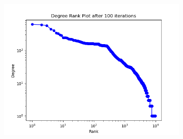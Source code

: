 \documentclass[12pt]{article}
\numberwithin{equation}{section}
\begin{document}
\begin{figure}[!ht]
\begin{subfigure}[b]{0.32\textwidth}
\end{subfigure}
\hfill
\begin{subfigure}[b]{0.32\textwidth}
    \includegraphics[width=\textwidth]{Heat S movie rank plot - 100 iterations.png}
\end{subfigure}

\vspace{1em} %


\end{figure}
\end{document}
